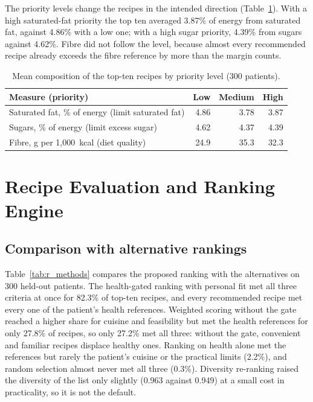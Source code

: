 The priority levels change the recipes in the intended direction
(Table~\ref{tab:r_response}). With a high saturated-fat priority the top ten
averaged 3.87\% of energy from saturated fat, against 4.86\% with a low one;
with a high sugar priority, 4.39\% from sugars against 4.62\%. Fibre did not
follow the level, because almost every recommended recipe already exceeds the
fibre reference by more than the margin counts.

\begin{table}[htbp]
\centering
\caption{Mean composition of the top-ten recipes by priority level (300 patients).}
\label{tab:r_response}
\begin{tabular}{p{5cm}rrr}
\toprule
Measure (priority) & Low & Medium & High \\
\midrule
Saturated fat, \% of energy (limit saturated fat) & 4.86 & 3.78 & 3.87 \\
Sugars, \% of energy (limit excess sugar) & 4.62 & 4.37 & 4.39 \\
Fibre, g per 1{,}000~kcal (diet quality) & 24.9 & 35.3 & 32.3 \\
\bottomrule
\end{tabular}
\end{table}

\section{Recipe Evaluation and Ranking Engine}
\label{sec:r_ranking}

\subsection{Comparison with alternative rankings}

Table~\ref{tab:r_methods} compares the proposed ranking with the alternatives
on 300 held-out patients. The health-gated ranking with personal fit met all
three criteria at once for 82.3\% of top-ten recipes, and every recommended
recipe met every one of the patient's health references. Weighted scoring
without the gate reached a higher share for cuisine and feasibility but met
the health references for only 27.8\% of recipes, so only 27.2\% met all
three: without the gate, convenient and familiar recipes displace healthy
ones. Ranking on health alone met the references but rarely the patient's
cuisine or the practical limits (2.2\%), and random selection almost never met
all three (0.3\%). Diversity re-ranking raised the diversity of the list only
slightly (0.963 against 0.949) at a small cost in practicality, so it is not
the default.

